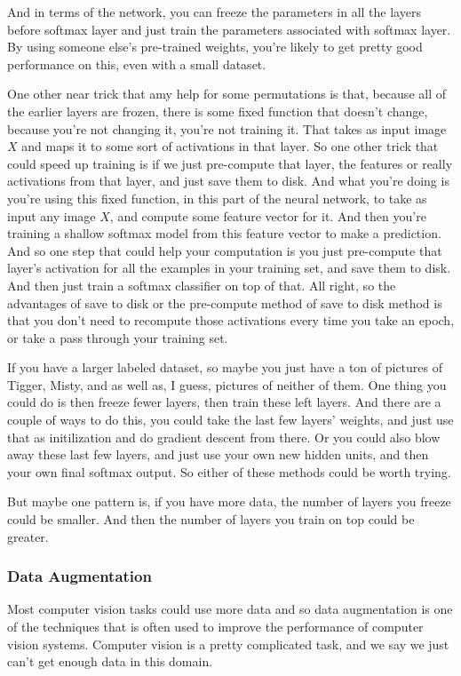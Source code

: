 \documentclass[UTF8]{article}
\begin{document}
And in terms of the network, you can freeze the parameters in all the layers before softmax layer
and just train the parameters associated with softmax layer. By using someone else's pre-trained
weights, you're likely to get pretty good performance on this, even with a small dataset.

One other near trick that amy help for some permutations is that, because all of the earlier layers
are frozen, there is some fixed function that doesn't change, because you're not changing it,
you're not training it. That takes as input image $X$ and maps it to some sort of activations in
that layer. So one other trick that could speed up training is if we just pre-compute that layer,
the features or really activations from that layer, and just save them to disk. And what you're
doing is you're using this fixed function, in this part of the neural network, to take as input any
image $X$, and compute some feature vector for it. And then you're training a shallow softmax model
from this feature vector to make a prediction. And so one step that could help your computation is
you just pre-compute that layer's activation for all the examples in your training set, and save
them to disk. And then just train a softmax classifier on top of that. All right, so the advantages
of save to disk or the pre-compute method of save to disk method is that you don't need to recompute
those activations every time you take an epoch, or take a pass through your training set.

If you have a larger labeled dataset, so maybe you just have a ton of pictures of Tigger, Misty,
and as well as, I guess, pictures of neither of them. One thing you could do is then freeze fewer
layers, then train these left layers. And there are a couple of ways to do this, you could take the
last few layers' weights, and just use that as initilization and do gradient descent from there. Or
you could also blow away these last few layers, and just use your own new hidden units, and then
your own final softmax output. So either of these methods could be worth trying.

But maybe one pattern is, if you have more data, the number of layers you freeze could be smaller.
And then the number of layers you train on top could be greater.

\subsubsection{Data Augmentation}
Most computer vision tasks could use more data and so data augmentation is one of the techniques
that is often used to improve the performance of computer vision systems. Computer vision is a
pretty complicated task, and we say we just can't get enough data in this domain.
\end{document}
